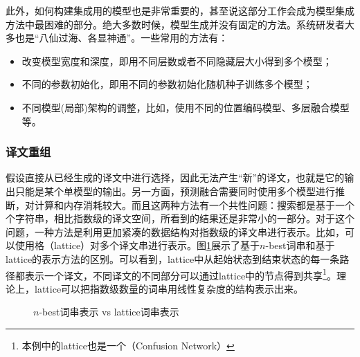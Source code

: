 \parinterval 此外，如何构建集成用的模型也是非常重要的，甚至说这部分工作会成为模型集成方法中最困难的部分。绝大多数时候，模型生成并没有固定的方法。系统研发者大多也是``八仙过海、各显神通''。一些常用的方法有：

\begin{itemize}
\vspace{0.5em}
\item 改变模型宽度和深度，即用不同层数或者不同隐藏层大小得到多个模型；
\vspace{0.5em}
\item 不同的参数初始化，即用不同的参数初始化随机种子训练多个模型；
\vspace{0.5em}
\item 不同模型(局部)架构的调整，比如，使用不同的位置编码模型\cite{Shaw2018SelfAttentionWR}、多层融合模型\cite{WangLearning}等。
\vspace{0.5em}
\end{itemize}


\subsubsection{译文重组}

\parinterval 假设直接从已经生成的译文中进行选择，因此无法产生``新''的译文，也就是它的输出只能是某个单模型的输出。另一方面，预测融合需要同时使用多个模型进行推断，对计算和内存消耗较大。而且这两种方法有一个共性问题：搜索都是基于一个个字符串，相比指数级的译文空间，所看到的结果还是非常小的一部分。对于这个问题，一种方法是利用更加紧凑的数据结构对指数级的译文串进行表示。比如，可以使用格（lattice）对多个译文串进行表示\cite{DBLP:conf/emnlp/TrombleKOM08}。图\ref{fig:7-26}展示了基于$n$-best词串和基于lattice的表示方法的区别。可以看到，lattice中从起始状态到结束状态的每一条路径都表示一个译文，不同译文的不同部分可以通过lattice中的节点得到共享\footnote{本例中的lattice也是一个{\scriptsize{}}（Confusion Network）}。理论上，lattice可以把指数级数量的词串用线性复杂度的结构表示出来。

\begin{figure}[htp]
\centering

\caption{$n$-best词串表示 vs lattice词串表示}
\label{fig:7-26}
\end{figure}

